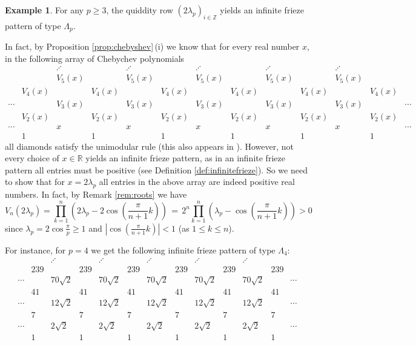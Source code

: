 \documentclass[11pt,a4paper]{amsart}
\theoremstyle{definition}
\newtheorem{Example}[Lemma]{Example}
\numberwithin{equation}{section}
\begin{document}
\begin{Example} \label{ex:lambda4}
For any $p\ge 3$, the quiddity row $(2\lambda_p)_{i\in \mathbb{Z}}$
yields an infinite frieze pattern of type $\Lambda_p$. 
\smallskip

In fact, by Proposition \ref{prop:chebyshev}\,(i) we know that for every real number $x$, in the following array of
Chebychev polynomials
$$\begin{array}{ccccccccccccc}
& & \iddots & & \iddots & & \iddots & & \iddots & & \iddots & & \\
& & V_5(x) & & V_5(x) & & V_5(x) & & V_5(x) & & V_5(x) & & \\
& V_4(x)& & V_4(x) & & V_4(x) & & V_4(x) & & V_4(x) & & V_4(x) & \\
\cdots & & V_3(x) & & V_3(x) & & V_3(x) & & V_3(x) & & V_3(x) & & \cdots \\
& V_2(x) & & V_2(x) & & V_2(x) & & V_2(x) & & V_2(x) & & V_2(x) & \\
\cdots & & x & & x & & x & & x & & x &  & \cdots \\
  & 1 & & 1 & & 1 & & 1 & & 1 & & 1 & 
 \end{array}
$$
all diamonds satisfy the unimodular rule (this also appears in \cite[Lemma 1]{BC21}). 
However, not every choice of $x\in \mathbb{R}$ 
yields an infinite frieze pattern, as in an infinite frieze pattern all entries must be positive
(see Definition \ref{def:infinitefrieze}). So we need to show that for $x=2\lambda_p$ all entries
in the above array are indeed positive real numbers. In fact, by Remark \ref{rem:roots} we have
$$
V_n(2\lambda_p) =  \prod_{k=1}^n \left(2\lambda_p- 2\cos\left(\frac{\pi}{n+1}k\right)\right)
\,=\, 2^n \prod_{k=1}^n \left(\lambda_p- \cos\left(\frac{\pi}{n+1}k\right)\right) >0
$$
since $\lambda_p = 2\cos \frac{\pi}{p}\ge 1$ and $|\cos(\frac{\pi}{n+1}k)|<1$ (as $1\le k\le n$).
 \smallskip
 
\smallskip

For instance, for $p=4$ we get the following infinite frieze pattern of type $\Lambda_4$:
$$\begin{array}{ccccccccccccc}
& & \iddots & & \iddots & & \iddots & & \iddots & & \iddots & & \\
& 239 & & 239 & & 239 & & 239 & & 239 & &239 & \\
\cdots & & 70\sqrt{2} & & 70\sqrt{2} & & 70\sqrt{2}& & 70\sqrt{2} & & 70\sqrt{2} & & \cdots \\
& 41& & 41& & 41 & & 41 & & 41 & &41 & \\
\cdots & & 12\sqrt{2} & & 12\sqrt{2} & & 12\sqrt{2}& & 12\sqrt{2} & & 12\sqrt{2} & & \cdots \\
& 7& & 7& & 7 & & 7 & & 7 & &7 & \\
\cdots & & 2\sqrt{2} & & 2\sqrt{2} & & 2\sqrt{2} & & 2\sqrt{2} & & 2\sqrt{2} &  & \cdots \\
  & 1 & & 1 & & 1 & & 1 & & 1 & & 1 & 
 \end{array}
$$

\end{Example}
\end{document}

